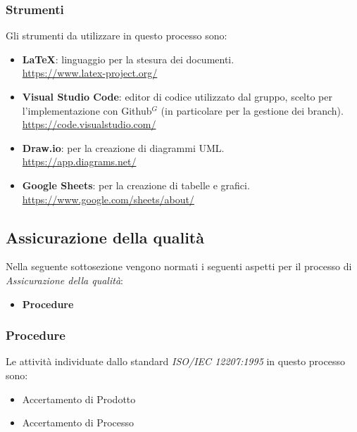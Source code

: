 \setlength\extrarowheight{0pt}
\subsubsection{Strumenti}
Gli strumenti da utilizzare in questo processo sono:
\begin{itemize}
    \item \textbf{\LaTeX}: linguaggio per la stesura dei documenti.\\
    \href{https://www.latex-project.org/}{https://www.latex-project.org/}
    \item \textbf{Visual Studio Code}: editor di codice utilizzato dal gruppo, scelto per \\ l'implementazione con Github$^G$  (in particolare per la gestione dei branch).\\
    \href{https://code.visualstudio.com/}{https://code.visualstudio.com/}
    \item \textbf{Draw.io}: per la creazione di diagrammi UML.\\
    \href{https://app.diagrams.net/}{https://app.diagrams.net/}
    \item \textbf{Google Sheets}: per la creazione di tabelle e grafici.\\
    \href{https://www.google.com/sheets/about/}{https://www.google.com/sheets/about/}
\end{itemize}

\subsection{Assicurazione della qualità}
Nella seguente sottosezione vengono normati i seguenti aspetti per il
processo di \textit{Assicurazione della qualità}:
\begin{itemize}
    \item \textbf{Procedure}
\end{itemize}

\subsubsection{Procedure}
Le attività individuate dallo standard \textit{ISO/IEC 12207:1995} in questo processo sono:
\begin{itemize}
    \item Accertamento di Prodotto
    \item Accertamento di Processo
\end{itemize}

